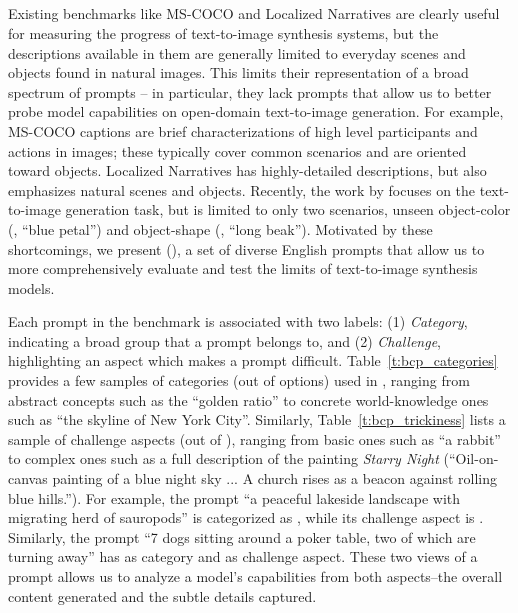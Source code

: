 \subsection{\bcp{}}
\label{secs:bcp}



Existing benchmarks like MS-COCO \cite{lin2014microsoft} and Localized Narratives \cite{PontTuset_eccv2020} are clearly useful for measuring the progress of text-to-image synthesis systems, but the descriptions available in them are generally limited to everyday scenes and objects found in natural images. This limits their representation of a broad spectrum of prompts -- in particular, they lack prompts that allow us to better probe model capabilities on open-domain text-to-image generation. For example, MS-COCO captions are brief characterizations of high level participants and actions in images; these typically cover common scenarios and are oriented toward objects. Localized Narratives has highly-detailed descriptions, but also emphasizes natural scenes and objects. Recently, the work by \cite{park2021benchmark} focuses on the text-to-image generation task, but is limited to only two scenarios, unseen object-color (\eg, ``blue petal'') and object-shape (\eg, ``long beak'').
Motivated by these shortcomings, we present \bcp{} (\bcpa{}), a set of \bcpsize{} diverse English prompts that allow us to more comprehensively evaluate and test the limits of text-to-image synthesis models.




Each prompt in the \bcpa{} benchmark is associated with two labels: (1) {\it Category}, indicating a broad group that a prompt belongs to, and (2) {\it Challenge}, highlighting an aspect which makes a prompt difficult.
Table~\ref{t:bcp_categories} provides a few samples of categories (out of \bcpcat{} options) used in \bcpa{}, ranging from abstract concepts such as the ``golden ratio'' to concrete world-knowledge ones such as ``the skyline of New York City''. Similarly, Table~\ref{t:bcp_trickiness} lists a sample of challenge aspects (out of \bcptrick{}), ranging from basic ones such as ``a rabbit'' to complex ones such as a full description of the painting \textit{Starry Night} (``Oil-on-canvas painting of a blue night sky ... A church rises as a beacon against rolling blue hills.''). For example, the prompt ``a peaceful lakeside landscape with migrating herd of sauropods'' is categorized as , while its challenge aspect is . Similarly, the prompt ``7 dogs sitting around a poker table, two of which are turning away'' has  as category and  as challenge aspect. These two views of a prompt allows us to analyze a model's capabilities from both aspects--the overall content generated and the subtle details captured.

